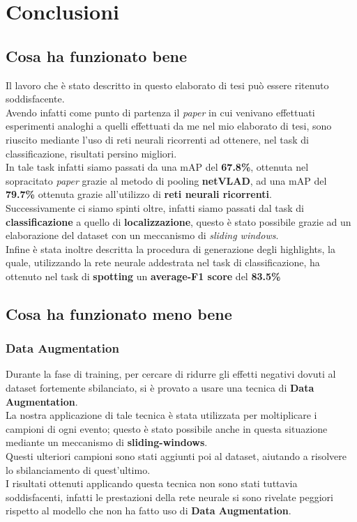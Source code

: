 \chapter{Conclusioni}\label{ch:conclusioni}
\section{Cosa ha funzionato bene}
Il lavoro che è stato descritto in questo elaborato di tesi può essere ritenuto soddisfacente.
\\Avendo infatti come punto di partenza il \textit{paper} \cite{soccerNet} in cui venivano effettuati esperimenti analoghi a quelli effettuati da me nel mio elaborato di tesi, sono riuscito mediante l'uso di reti neurali ricorrenti ad ottenere, nel task di classificazione, risultati persino migliori.
\\In tale task infatti siamo passati da una mAP del\textbf{ 67.8\%}, ottenuta nel sopracitato \textit{paper} grazie al metodo di pooling \textbf{netVLAD}, ad una mAP del \textbf{79.7\%} ottenuta grazie all'utilizzo di \textbf{reti neurali ricorrenti}.
\\Successivamente ci siamo spinti oltre, infatti siamo passati dal task di \textbf{classificazione} a quello di \textbf{localizzazione}, questo è stato possibile grazie ad un elaborazione del dataset con un meccanismo di \textit{sliding windows}.
\\Infine è stata inoltre descritta la procedura di generazione degli highlights, la quale, utilizzando la rete neurale addestrata nel task di classificazione, ha ottenuto nel task di \textbf{spotting} un \textbf{average-F1 score} del \textbf{83.5\%}
\section{Cosa ha funzionato meno bene}
\subsection{Data Augmentation}
Durante la fase di training, per cercare di ridurre gli effetti negativi dovuti al dataset fortemente sbilanciato, si è provato a usare una tecnica di \textbf{Data Augmentation}.
\\La nostra applicazione di tale tecnica è stata utilizzata per moltiplicare i campioni di ogni evento; questo è stato possibile anche in questa situazione mediante un meccanismo di \textbf{sliding-windows}.
\\Questi ulteriori campioni sono stati aggiunti poi al dataset, aiutando a risolvere lo sbilanciamento di quest'ultimo.
\\I risultati ottenuti applicando questa tecnica non sono stati tuttavia soddisfacenti, infatti le prestazioni della rete neurale si sono rivelate peggiori rispetto al modello che non ha fatto uso di \textbf{Data Augmentation}.
